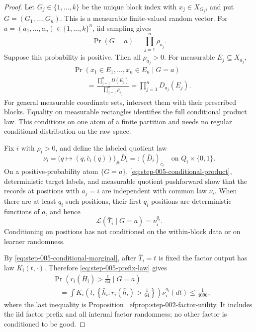 \begin{proof}
Let \(G_j\in\{1,\ldots,k\}\) be the unique block index with
\(x_j\in X_{G_j}\), and put \(G=(G_1,\ldots,G_n)\).  This is a measurable
finite-valued random vector.  For
\(a=(a_1,\ldots,a_n)\in\{1,\ldots,k\}^n\), iid sampling gives
\begin{equation}\label{eq:step-005-position-probability}
\Pr(G=a)=\prod_{j=1}^n\rho_{a_j}.
\end{equation}
Suppose this probability is positive.  Then all \(\rho_{a_j}>0\).  For
measurable \(E_j\subseteq X_{a_j}\),
\begin{equation}\label{eq:step-005-conditional-product}
\begin{split}
&\Pr(x_1\in E_1,\ldots,x_n\in E_n\mid G=a)\\
&\qquad=
\frac{\prod_{j=1}^nD(E_j)}{\prod_{j=1}^n\rho_{a_j}}
=\prod_{j=1}^nD_{a_j}(E_j).
\end{split}
\end{equation}
For general measurable coordinate sets, intersect them with their
prescribed blocks.  Equality on measurable rectangles identifies the full
conditional product law.  This conditions on one atom of a finite
partition and needs no regular conditional distribution on the raw space.

Fix \(i\) with \(\rho_i>0\), and define the labeled quotient law
\begin{equation}\label{eq:step-005-labeled-quotient-law}
\nu_i
=\bigl(q\mapsto(q,\bar c_i(q))\bigr)_\#\bar D_i
=:(\bar D_i)_{\bar c_i}
\quad\text{on }Q_i\times\{0,1\}.
\end{equation}
On a positive-probability atom \(\{G=a\}\),
\eqref{eq:step-005-conditional-product}, deterministic target labels, and
measurable quotient pushforward show that the records at positions with
\(a_j=i\) are independent with common law \(\nu_i\).  When there are at
least \(q_i\) such positions, their first \(q_i\) positions are
deterministic functions of \(a\), and hence
\begin{equation}\label{eq:step-005-prefix-law}
\mathcal L(\bar T_i\mid G=a)=\nu_i^{q_i}.
\end{equation}
Conditioning on positions has not conditioned on the within-block data or
on learner randomness.

By \eqref{eq:step-005-conditional-marginal}, after \(\bar T_i=t\) is
fixed the factor output has law \(K_i(t,\cdot)\).  Therefore
\eqref{eq:step-005-prefix-law} gives
\begin{equation}\label{eq:step-005-factor-utility-integral}
\begin{split}
&\Pr\!\left(r_i(\bar H_i)>\frac1{64}\mid G=a\right)\\
&\quad=
\int K_i\!\left(
t,\left\{\bar h_i:r_i(\bar h_i)>\frac1{64}\right\}
\right)\nu_i^{q_i}(dt)
\le\frac1{4096},
\end{split}
\end{equation}
where the last inequality is Proposition~
ef{prop:step-002-factor-utility}.
It includes the iid factor prefix and all internal factor randomness; no
other factor is conditioned to be good.


\end{proof}
